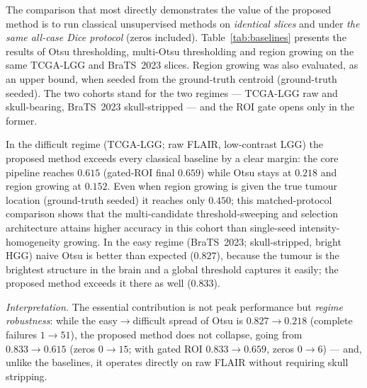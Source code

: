 \documentclass[11pt,a4paper]{article}
\begin{document}
The comparison that most directly demonstrates the value of the proposed method is
to run classical unsupervised methods on \emph{identical slices} and under
\emph{the same all-case Dice protocol} (zeros included). Table~\ref{tab:baselines}
presents the results of Otsu thresholding, multi-Otsu thresholding and region
growing on the same TCGA-LGG and BraTS~2023 slices. Region growing was also
evaluated, as an upper bound, when seeded from the ground-truth centroid
(ground-truth seeded). The two cohorts stand for the two regimes --- TCGA-LGG raw
and skull-bearing, BraTS~2023 skull-stripped --- and the ROI gate opens only in the
former.

In the difficult regime (TCGA-LGG; raw FLAIR, low-contrast LGG) the proposed
method exceeds every classical baseline by a clear margin: the core pipeline
reaches $0.615$ (gated-ROI final $0.659$) while Otsu stays at $0.218$ and region
growing at $0.152$. Even when region growing is given the true tumour location
(ground-truth seeded) it reaches only $0.450$; this matched-protocol comparison
shows that the multi-candidate threshold-sweeping and selection architecture
attains higher accuracy in this cohort than single-seed intensity-homogeneity
growing. In the easy regime (BraTS~2023; skull-stripped, bright HGG) naive Otsu is
better than expected ($0.827$), because the tumour is the brightest structure in
the brain and a global threshold captures it easily; the proposed method exceeds it
there as well ($0.833$).

\emph{Interpretation.} The essential contribution is not peak performance but
\emph{regime robustness}: while the easy$\to$difficult spread of Otsu is
$0.827 \to 0.218$ (complete failures $1 \to 51$), the proposed method does not
collapse, going from $0.833 \to 0.615$ (zeros $0 \to 15$; with gated ROI
$0.833 \to 0.659$, zeros $0 \to 6$) --- and, unlike the baselines, it operates
directly on raw FLAIR without requiring skull stripping.
\end{document}
